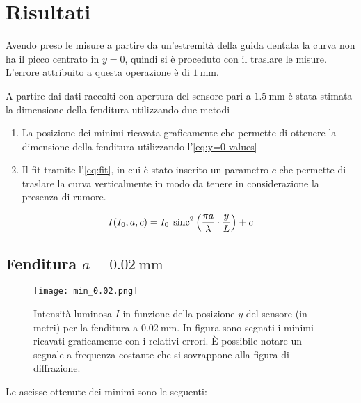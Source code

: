 \documentclass[../main.tex]{subfiles}
\begin{document}
\section{Risultati}

Avendo preso le misure a partire da un'estremità della guida dentata la curva non ha il picco centrato in $y = 0$, quindi si è proceduto con il traslare le misure. L'errore attribuito a questa operazione è di $\qty{1}{\mm}$.

A partire dai dati raccolti con apertura del sensore pari a $\qty{1.5}{\mm}$ 
è stata stimata la dimensione della fenditura utilizzando due metodi

\begin{enumerate}
    \item La posizione dei minimi ricavata graficamente che permette di ottenere la dimensione della fenditura utilizzando l'\autoref{eq:y=0 values}
    \item Il fit tramite l'\autoref{eq:fit}, in cui è stato inserito un parametro $c$ che permette di traslare la curva verticalmente in modo da tenere in considerazione la presenza di rumore.
\end{enumerate}

\begin{equation} \label{eq:fit}
    I(I_{0}, a, c) = I_{0} \; \operatorname{sinc}^{2} \left( \frac{\pi a}{\lambda} \cdot \frac{y}{L} \right) + c
\end{equation}

\subsection{Fenditura $a = \qty{0.02}{\milli\metre}$}

\begin{figure}[ht!]
    \centering
    \texttt{[image: min\_0.02.png]}
    \caption{Intensità luminosa $I$ in funzione della posizione $y$ del sensore (in metri) per la fenditura a $\qty{0.02}{\milli\metre}$. In figura sono segnati i minimi ricavati graficamente con i relativi errori. È possibile notare un segnale a frequenza costante che si sovrappone alla figura di diffrazione.} %
    \label{fig:minimi 0.02}
\end{figure}

Le ascisse ottenute dei minimi sono le seguenti:
\end{document}
